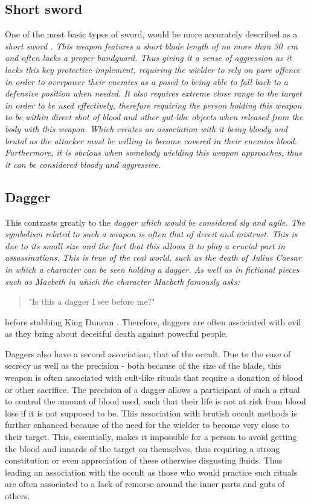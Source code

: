 \documentclass{article}
\begin{document}
\subsection*{Short sword}
One of the most basic types of sword, would be more accurately described as a \em{short sword} \parencite{mcnab2010swords}. This weapon features a short blade length of no more than 30 cm and often lacks a proper handguard. Thus giving it a sense of aggression as it lacks this key protective implement, requiring the wielder to rely on pure offence in order to overpower their enemies as a posed to being able to fall back to a defensive position when needed. It also requires extreme close range to the target in order to be used effectively, therefore requiring the person holding this weapon to be within direct shot of blood and other gut-like objects when released from the body with this weapon. Which creates an association with it being bloody and brutal as the attacker must be willing to become covered in their enemies blood. Furthermore, it is obvious when somebody wielding this weapon approaches, thus it can be considered bloody and aggressive.

\subsection*{Dagger}
This contrasts greatly to the \em{dagger} which would be considered sly and agile. The symbolism related to such a weapon is often that of deceit and mistrust. This is due to its small size and the fact that this allows it to play a crucial part in assassinations. This is true of the real world, such as the death of Julius Caesar \parencite{caesar} in which a character can be seen holding a dagger. As well as in fictional pieces such as Macbeth in which the character Macbeth famously asks: \begin{quote}
    "Is this a dagger I see before me?"
\end{quote}
before stabbing King Duncan \parencite{macbeth}. Therefore, daggers are often associated with evil as they bring about deceitful death against powerful people.

Daggers also have a second association, that of the occult. Due to the ease of secrecy as well as the precision - both because of the size of the blade, this weapon is often associated with cult-like rituals that require a donation of blood or other sacrifice. The precision of a dagger allows a participant of such a ritual to control the amount of blood used, such that their life is not at risk from blood loss if it is not supposed to be. This association with brutish occult methods is further enhanced because of the need for the wielder to become very close to their target. This, essentially, makes it impossible for a person to avoid getting the blood and innards of the target on themselves, thus requiring a strong constitution or even appreciation of these otherwise disgusting fluids. Thus leading an association with the occult as those who would practice such rituals are often associated to a lack of remorse around the inner parts and guts of others.
\end{document}
